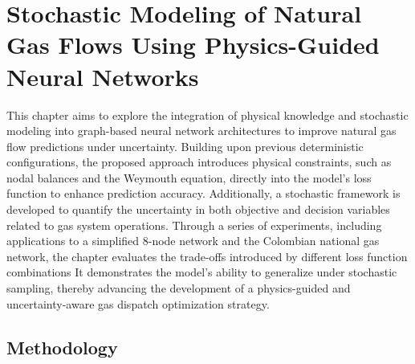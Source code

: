 \chapter{Stochastic Modeling of Natural Gas Flows Using Physics-Guided Neural Networks} \label{cap:non_linealcensnet}

This chapter aims to explore the integration of physical knowledge and stochastic modeling into graph-based neural network architectures to improve natural gas flow predictions under uncertainty. Building upon previous deterministic configurations, the proposed approach introduces physical constraints, such as nodal balances and the Weymouth equation, directly into the model’s loss function to enhance prediction accuracy. Additionally, a stochastic framework is developed to quantify the uncertainty in both objective and decision variables related to gas system operations. Through a series of experiments, including applications to a simplified 8-node network and the Colombian national gas network, the chapter evaluates the trade-offs introduced by different loss function combinations It demonstrates the model’s ability to generalize under stochastic sampling, thereby advancing the development of a physics-guided and uncertainty-aware gas dispatch optimization strategy.


\section{Methodology}

